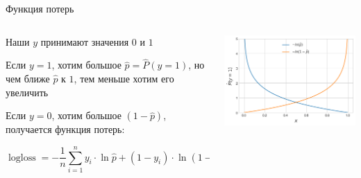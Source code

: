 \documentclass[notes,12pt, aspectratio=169]{beamer}
\newenvironment{wideitemize}{\itemize\addtolength{\itemsep}{10pt}}{\enditemize}
\DeclareMathOperator{\logloss}{logloss}
\begin{document}
\begin{frame}{Функция потерь}
	\begin{columns}[T] %
	\begin{column}{.5\textwidth}
		\begin{wideitemize}
			\item Наши $y$ принимают значения $0$ и $1$
			\item Если $y = 1$, хотим большое $\hat p = \hat P(y = 1)$, но чем ближе $\hat p$ к $1$, тем меньше хотим его увеличить
			\item Если $y = 0$, хотим большое $(1 - \hat p)$, получается функция потерь:

			$$
			\logloss = - \frac{1}{n} \sum_{i=1}^n y_i \cdot \ln \hat p + (1 - y_i) \cdot \ln (1 - \hat p)
			$$
		\end{wideitemize}
	\end{column}%
	\hfill%
	\begin{column}{.5\textwidth}
		\begin{center}
			\includegraphics[width= 0.95\linewidth]{log_loss_05.png}
		\end{center}
	\end{column}%
\end{columns}
\end{frame}
\end{document}
